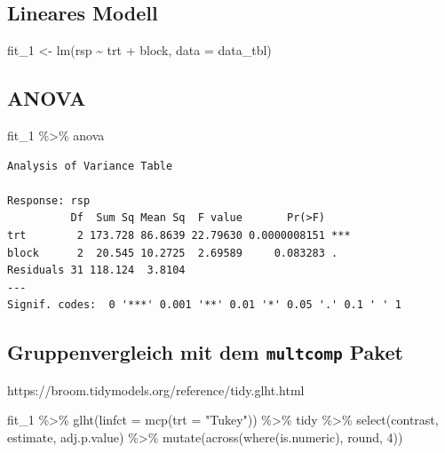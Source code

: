 \documentclass[
  letterpaper,
]{scrbook}
\newenvironment{Shaded}{\begin{snugshade}}{\end{snugshade}}
\newcommand{\AttributeTok}[1]{\textcolor[rgb]{0.40,0.45,0.13}{#1}}
\newcommand{\DecValTok}[1]{\textcolor[rgb]{0.68,0.00,0.00}{#1}}
\newcommand{\FunctionTok}[1]{\textcolor[rgb]{0.28,0.35,0.67}{#1}}
\newcommand{\NormalTok}[1]{\textcolor[rgb]{0.00,0.23,0.31}{#1}}
\newcommand{\OtherTok}[1]{\textcolor[rgb]{0.00,0.23,0.31}{#1}}
\newcommand{\SpecialCharTok}[1]{\textcolor[rgb]{0.37,0.37,0.37}{#1}}
\newcommand{\StringTok}[1]{\textcolor[rgb]{0.13,0.47,0.30}{#1}}
\begin{document}
\hypertarget{lineares-modell}{%
\subsection{Lineares Modell}\label{lineares-modell}}

\begin{Shaded}
\begin{Highlighting}[]
\NormalTok{fit\_1 }\OtherTok{\textless{}{-}} \FunctionTok{lm}\NormalTok{(rsp }\SpecialCharTok{\textasciitilde{}}\NormalTok{ trt }\SpecialCharTok{+}\NormalTok{ block, }\AttributeTok{data =}\NormalTok{ data\_tbl)}
\end{Highlighting}
\end{Shaded}

\hypertarget{anova}{%
\subsection{ANOVA}\label{anova}}

\begin{Shaded}
\begin{Highlighting}[]
\NormalTok{fit\_1 }\SpecialCharTok{\%\textgreater{}\%}\NormalTok{ anova}
\end{Highlighting}
\end{Shaded}

\begin{verbatim}
Analysis of Variance Table

Response: rsp
          Df  Sum Sq Mean Sq  F value       Pr(>F)    
trt        2 173.728 86.8639 22.79630 0.0000008151 ***
block      2  20.545 10.2725  2.69589     0.083283 .  
Residuals 31 118.124  3.8104                          
---
Signif. codes:  0 '***' 0.001 '**' 0.01 '*' 0.05 '.' 0.1 ' ' 1
\end{verbatim}

\hypertarget{gruppenvergleich-mit-dem-multcomp-paket}{%
\subsection{\texorpdfstring{Gruppenvergleich mit dem \texttt{multcomp}
Paket}{Gruppenvergleich mit dem multcomp Paket}}\label{gruppenvergleich-mit-dem-multcomp-paket}}

https://broom.tidymodels.org/reference/tidy.glht.html

\begin{Shaded}
\begin{Highlighting}[]
\NormalTok{fit\_1 }\SpecialCharTok{\%\textgreater{}\%} 
  \FunctionTok{glht}\NormalTok{(}\AttributeTok{linfct =} \FunctionTok{mcp}\NormalTok{(}\AttributeTok{trt =} \StringTok{"Tukey"}\NormalTok{)) }\SpecialCharTok{\%\textgreater{}\%} 
\NormalTok{  tidy }\SpecialCharTok{\%\textgreater{}\%} 
  \FunctionTok{select}\NormalTok{(contrast, estimate, adj.p.value) }\SpecialCharTok{\%\textgreater{}\%} 
  \FunctionTok{mutate}\NormalTok{(}\FunctionTok{across}\NormalTok{(}\FunctionTok{where}\NormalTok{(is.numeric), round, }\DecValTok{4}\NormalTok{))}
\end{Highlighting}
\end{Shaded}
\end{document}
